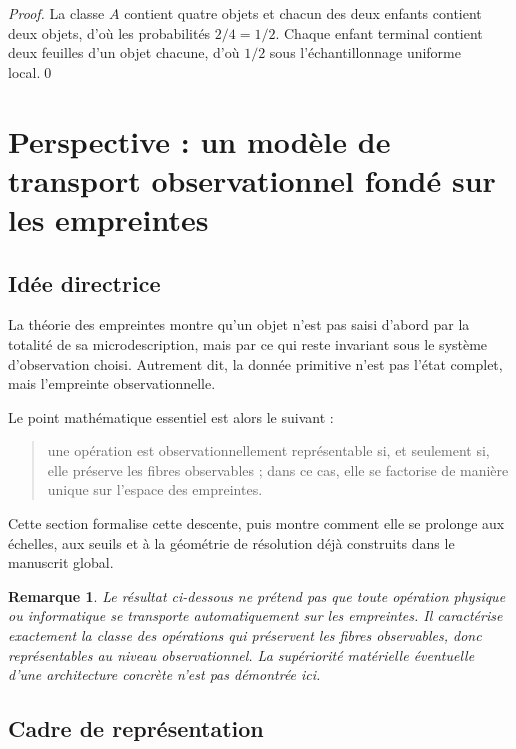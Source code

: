 \documentclass[11pt,a4paper,openany]{book}
\newtheorem{remark}[definition]{Remarque}
\begin{document}
\begin{proof}
La classe \(A\) contient quatre objets et chacun des deux enfants contient deux objets, d'où les probabilités \(2/4=1/2\). Chaque enfant terminal contient deux feuilles d'un objet chacune, d'où \(1/2\) sous l'échantillonnage uniforme local.\qed\end{proof}

\section{Perspective : un modèle de transport observationnel fondé sur les empreintes}

\subsection{Idée directrice}

La théorie des empreintes montre qu'un objet n'est pas saisi d'abord par la totalité de sa microdescription, mais par ce qui reste invariant sous le système d'observation choisi. Autrement dit, la donnée primitive n'est pas l'état complet, mais l'empreinte observationnelle.

Le point mathématique essentiel est alors le suivant :

\begin{quote}
une opération est observationnellement représentable si, et seulement si, elle préserve les fibres observables ; dans ce cas, elle se factorise de manière unique sur l'espace des empreintes.
\end{quote}

Cette section formalise cette descente, puis montre comment elle se prolonge aux échelles, aux seuils et à la géométrie de résolution déjà construits dans le manuscrit global.

\begin{remark}
Le résultat ci-dessous ne prétend pas que toute opération physique ou informatique se transporte automatiquement sur les empreintes. Il caractérise exactement la classe des opérations qui préservent les fibres observables, donc représentables au niveau observationnel. La supériorité matérielle éventuelle d'une architecture concrète n'est pas démontrée ici.
\end{remark}

\subsection{Cadre de représentation}
\end{document}
